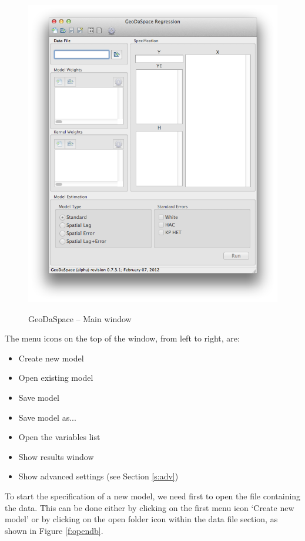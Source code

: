 \documentclass{article}
\begin{document}
\begin{figure}[htb]
\begin{center}
\includegraphics[width=0.8\linewidth]{GUI.png}\\
\caption{GeoDaSpace -- Main window}
\label{f:gui}
\end{center}
\end{figure}

The menu icons on the top of the window, from left to right, are:
\begin{itemize}
\item Create new model
\item Open existing model
\item Save model
\item Save model as...
\item Open the variables list
\item Show results window
\item Show advanced settings (see Section \ref{s:adv})
\end{itemize}

To start the specification of a new model, we need first to open the file containing the data. This can be done either by clicking on the first menu icon `Create new model' or by clicking on the open folder icon within the data file section, as shown in Figure \ref{f:opendb}.
\end{document}
